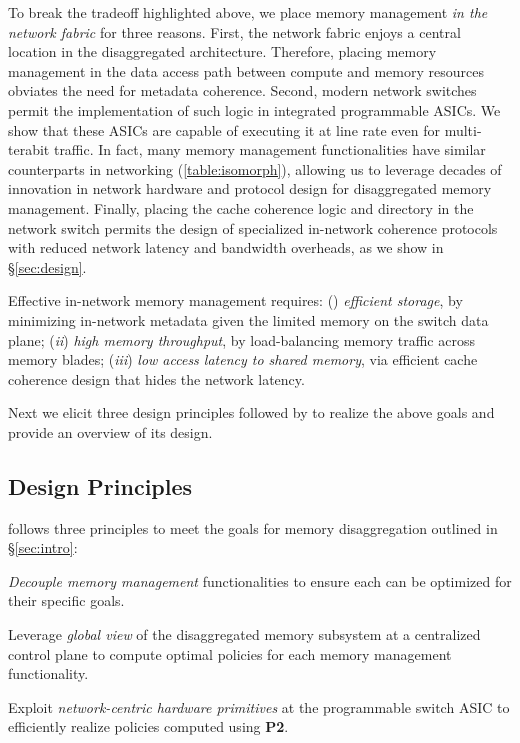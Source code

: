 To break the tradeoff highlighted above, we place memory management \textit{in the network fabric} for three reasons.
First, the network fabric enjoys a central location in the disaggregated architecture. Therefore, placing memory management in the data access path between compute and memory resources obviates the need for metadata coherence. 
Second, modern network switches~\cite{progswitch1, progswitch2, progswitch3} permit the implementation of such logic in integrated programmable ASICs. We show that these ASICs are capable of executing it at line rate even for multi-terabit traffic. In fact, many memory management functionalities have similar counterparts in networking (\autoref{table:isomorph}), allowing us to leverage decades of innovation in network hardware and protocol design for disaggregated memory management.
Finally, placing the cache coherence logic and directory in the network switch permits the design of specialized in-network coherence protocols with reduced network latency and bandwidth overheads, as we show in \S\ref{sec:design}. 

Effective in-network memory management requires: () \emph{efficient storage}, by  minimizing in-network metadata given the limited memory on the switch data plane;  (\textit{ii}) \emph{high memory throughput}, by load-balancing memory traffic across memory blades; (\textit{iii}) \emph{low access latency to shared memory}, via efficient cache coherence design that hides the network latency.

Next we elicit  three design principles followed by \mind to realize the above goals and provide an overview of its design.

\subsection{Design Principles}
\label{ssec:principles}

\mind follows three principles to meet the goals for memory disaggregation outlined in \S\ref{sec:intro}:

 \textit{Decouple memory management} functionalities to ensure each can be optimized for their specific goals.

 Leverage \textit{global view} of the disaggregated memory subsystem at a centralized control plane to compute optimal policies for each memory management functionality.

 Exploit \textit{network-centric hardware primitives} at the programmable switch ASIC to efficiently realize policies computed using \textbf{P2}.

